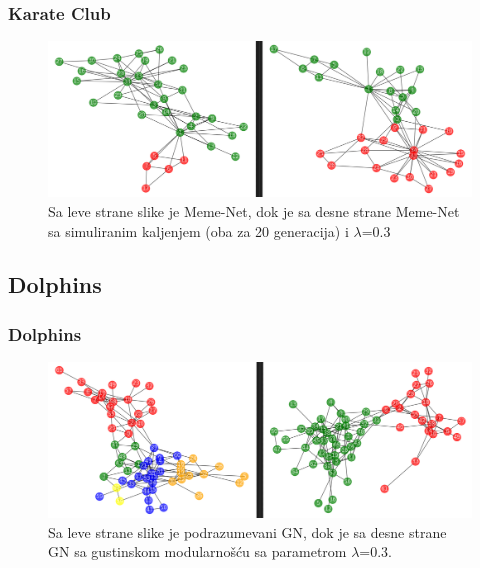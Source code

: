 \documentclass{beamer}
\begin{document}
\begin{frame}\frametitle{Karate Club}
\begin{figure}[h!]
\begin{center}
\includegraphics[scale=0.23]{GN3_comparing.png}
\end{center}
\caption{Sa leve strane slike je Meme-Net, dok je sa desne strane Meme-Net sa simuliranim kaljenjem (oba za 20 generacija) i $\lambda$=0.3}
\label{fig:Meme2}
\end{figure}
\end{frame}

\subsection{Dolphins}
\begin{frame}\frametitle{Dolphins}
\begin{figure}[h!]
\begin{center}
\includegraphics[scale=0.23]{GN_dolphins1.png}
\end{center}
\caption{Sa leve strane slike je podrazumevani GN, dok je sa desne strane GN sa gustinskom modularnošću sa parametrom $\lambda$=0.3.}
\label{fig:GN_Dolp_1}
\end{figure}
\end{frame}
\end{document}
